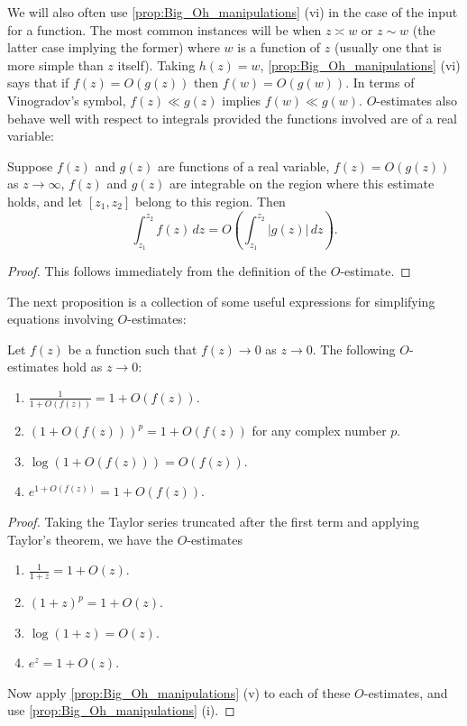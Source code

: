         We will also often use \cref{prop:Big_Oh_manipulations} (vi) in the case of the input for a function. The most common instances will be when $z \asymp w$ or $z \sim w$ (the latter case implying the former) where $w$ is a function of $z$ (usually one that is more simple than $z$ itself). Taking $h(z) = w$, \cref{prop:Big_Oh_manipulations} (vi) says that if $f(z) = O(g(z))$ then $f(w) = O(g(w))$. In terms of Vinogradov's symbol, $f(z) \ll g(z)$ implies $f(w) \ll g(w)$. $O$-estimates also behave well with respect to integrals provided the functions involved are of a real variable:

        \begin{proposition}
          Suppose $f(z)$ and $g(z)$ are functions of a real variable, $f(z) = O(g(z))$ as $z \to \infty$, $f(z)$ and $g(z)$ are integrable on the region where this estimate holds, and let $[z_{1},z_{2}]$ belong to this region. Then
          \[
            \int_{z_{1}}^{z_{2}}f(z)\,dz = O\left(\int_{z_{1}}^{z_{2}}|g(z)|\,dz\right).
          \]
        \end{proposition}
        \begin{proof}
          This follows immediately from the definition of the $O$-estimate.
        \end{proof}

        The next proposition is a collection of some useful expressions for simplifying equations involving $O$-estimates:

        \begin{proposition}
          Let $f(z)$ be a function such that $f(z) \to 0$ as $z \to 0$. The following $O$-estimates hold as $z \to 0$:
          \begin{enumerate}[label=(\roman*)]
            \item $\frac{1}{1+O(f(z))} = 1+O(f(z))$.
            \item $(1+O(f(z)))^{p} = 1+O(f(z))$ for any complex number $p$.
            \item $\log(1+O(f(z))) = O(f(z))$.
            \item $e^{1+O(f(z))} = 1+O(f(z))$.
          \end{enumerate}
        \end{proposition}
        \begin{proof}
          Taking the Taylor series truncated after the first term and applying Taylor's theorem, we have the $O$-estimates
          \begin{enumerate}[label=(\roman*)]
            \item $\frac{1}{1+z} = 1+O(z)$.
            \item $(1+z)^{p} = 1+O(z)$.
            \item $\log(1+z) = O(z)$.
            \item $e^{z} = 1+O(z)$.
          \end{enumerate}
          Now apply \cref{prop:Big_Oh_manipulations} (v) to each of these $O$-estimates, and use \cref{prop:Big_Oh_manipulations} (i).
        \end{proof}

